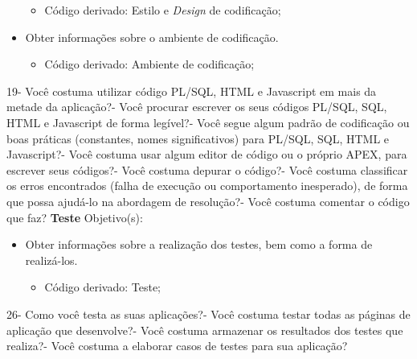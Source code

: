 \begin{apendicesenv}
\begin{itemize}
	\begin{itemize}
		\item Código derivado: Estilo e \textit{Design} de codificação;
	\end{itemize}
	\item Obter informações sobre o ambiente de codificação.
	\begin{itemize}
		\item Código derivado: Ambiente de codificação;
	\end{itemize}
\end{itemize}
19- Você costuma utilizar código PL/SQL, HTML e Javascript em mais da metade da aplicação?- Você procurar escrever os seus códigos PL/SQL, SQL, HTML e Javascript de forma legível?- Você segue algum padrão de codificação ou boas práticas (constantes, nomes significativos) para PL/SQL, SQL, HTML e Javascript?- Você costuma usar algum editor de código ou o próprio APEX, para escrever seus códigos?- Você costuma depurar o código?- Você costuma classificar os erros encontrados (falha de execução ou comportamento inesperado), de forma que possa ajudá-lo na abordagem de resolução?- Você costuma comentar o código que faz?\newline
\newline\newline
\textbf{Teste}\newline\newline
Objetivo(s):
\begin{itemize}
	\item Obter informações sobre a realização dos testes, bem como a forma de realizá-los.
	\begin{itemize}
		\item Código derivado: Teste;
	\end{itemize}
\end{itemize}
26- Como você testa as suas aplicações?- Você costuma testar todas as páginas de aplicação que desenvolve?- Você costuma armazenar os resultados dos testes que realiza?- Você costuma a elaborar casos de testes para sua aplicação?\newline

\end{apendicesenv}
